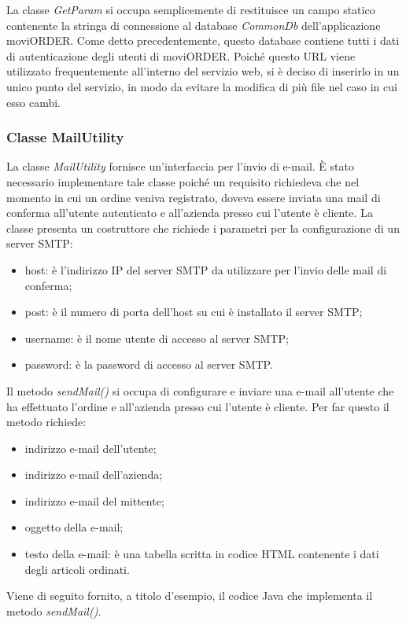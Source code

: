 La classe \textit{GetParam} si occupa semplicemente di restituisce un campo statico contenente la stringa di connessione al database \textit{CommonDb} dell'applicazione moviORDER. Come detto precedentemente, questo database contiene tutti i dati di autenticazione degli utenti di moviORDER. Poiché questo URL viene utilizzato frequentemente all'interno del servizio web, si è deciso di inserirlo in un unico punto del servizio, in modo da evitare la modifica di più file nel caso in cui esso cambi.

\subsubsection{Classe MailUtility}

La classe \textit{MailUtility} fornisce un'interfaccia per l'invio di e-mail. È stato necessario implementare tale classe poiché un requisito richiedeva che nel momento in cui un ordine veniva registrato, doveva essere inviata una mail di conferma all'utente autenticato e all'azienda presso cui l'utente è cliente. La classe presenta un costruttore che richiede i parametri per la configurazione di un server SMTP:
\begin{itemize}
	\item host: è l'indirizzo IP del server SMTP da utilizzare per l'invio delle mail di conferma;
	\item post: è il numero di porta dell'host su cui è installato il server SMTP;
	\item username: è il nome utente di accesso al server SMTP;
	\item password: è la password di accesso al server SMTP.
\end{itemize}
Il metodo \textit{sendMail()} si occupa di configurare e inviare una e-mail all'utente che ha effettuato l'ordine e all'azienda presso cui l'utente è cliente. Per far questo il metodo richiede:
\begin{itemize}
	\item indirizzo e-mail dell'utente;
	\item indirizzo e-mail dell'azienda;
	\item indirizzo e-mail del mittente;
	\item oggetto della e-mail;
	\item testo della e-mail: è una tabella scritta in codice HTML contenente i dati degli articoli ordinati.
\end{itemize}
Viene di seguito fornito, a titolo d'esempio, il codice Java che implementa il metodo \textit{sendMail()}.

